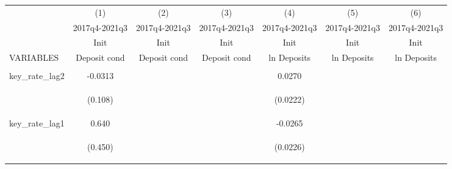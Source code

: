 \documentclass[]{article}
\begin{document}
\begin{center}
\begin{tabular}{lcccccc} \hline
 & (1) & (2) & (3) & (4) & (5) & (6) \\
 & 2017q4-2021q3 & 2017q4-2021q3 & 2017q4-2021q3 & 2017q4-2021q3 & 2017q4-2021q3 & 2017q4-2021q3 \\
 & Init & Init & Init & Init & Init & Init \\
VARIABLES & Deposit cond & Deposit cond & Deposit cond & ln Deposits & ln Deposits & ln Deposits \\ \hline
\vspace{4pt} & \begin{footnotesize}\end{footnotesize} & \begin{footnotesize}\end{footnotesize} & \begin{footnotesize}\end{footnotesize} & \begin{footnotesize}\end{footnotesize} & \begin{footnotesize}\end{footnotesize} & \begin{footnotesize}\end{footnotesize} \\
key\_rate\_lag2 & -0.0313 &  &  & 0.0270 &  &  \\
\vspace{4pt} & \begin{footnotesize}(0.108)\end{footnotesize} & \begin{footnotesize}\end{footnotesize} & \begin{footnotesize}\end{footnotesize} & \begin{footnotesize}(0.0222)\end{footnotesize} & \begin{footnotesize}\end{footnotesize} & \begin{footnotesize}\end{footnotesize} \\
key\_rate\_lag1 & 0.640 &  &  & -0.0265 &  &  \\
\vspace{4pt} & \begin{footnotesize}(0.450)\end{footnotesize} & \begin{footnotesize}\end{footnotesize} & \begin{footnotesize}\end{footnotesize} & \begin{footnotesize}(0.0226)\end{footnotesize} & \begin{footnotesize}\end{footnotesize} & \begin{footnotesize}\end{footnotesize} \\

\end{tabular}
\end{center}
\end{document}
